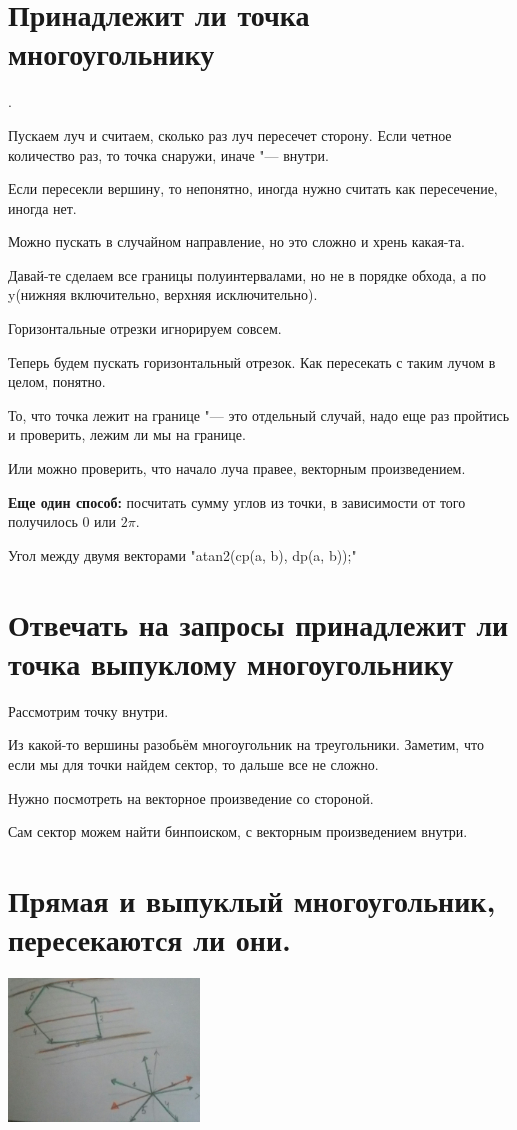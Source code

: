 \section{Принадлежит ли точка многоугольнику}.

Пускаем луч и считаем, сколько раз луч пересечет сторону. Если четное количество раз, то точка снаружи, иначе "--- внутри.

Если пересекли вершину, то непонятно, иногда нужно считать как пересечение, иногда нет. 

Можно пускать в случайном направление, но это сложно и хрень какая-та. 

Давай-те сделаем все границы полуинтервалами, но не в порядке обхода, а по y(нижняя включительно, верхняя исключительно).

Горизонтальные отрезки игнорируем совсем. 

Теперь будем пускать горизонтальный отрезок. Как пересекать с таким лучом в целом, понятно.

То, что точка лежит на границе "--- это отдельный случай, надо еще раз пройтись и проверить, лежим ли мы на границе.

Или можно проверить, что начало луча правее, векторным произведением.

\textbf{Еще один способ:} посчитать сумму углов из точки, в зависимости от того получилось 0 или $2\pi$.

Угол между двумя векторами \cpp"atan2(cp(a, b), dp(a, b));"

\section{Отвечать на запросы принадлежит ли точка выпуклому многоугольнику}

Рассмотрим точку внутри.

Из какой-то вершины разобьём многоугольник на треугольники. Заметим, что если мы для точки
найдем сектор, то дальше все не сложно.

Нужно посмотреть на векторное произведение со стороной.

Сам сектор можем найти бинпоиском, с векторным произведением внутри.

\section{Прямая и выпуклый многоугольник, пересекаются ли они.}

\begin{center} 
\includegraphics[width=2in, keepaspectratio]{im01.jpg} 
\end{center}


